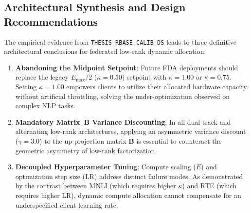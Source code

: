 \documentclass[10pt,a4paper]{article}
\begin{document}
\subsection{Architectural Synthesis and Design Recommendations}
The empirical evidence from \texttt{THESIS-RBASE-CALIB-DS} leads to three definitive architectural conclusions for federated low-rank dynamic allocation:
\begin{enumerate}
    \item \textbf{Abandoning the Midpoint Setpoint}: Future FDA deployments should replace the legacy $E_{\max}/2$ ($\kappa=0.50$) setpoint with $\kappa = 1.00$ or $\kappa = 0.75$. Setting $\kappa = 1.00$ empowers clients to utilize their allocated hardware capacity without artificial throttling, solving the under-optimization observed on complex NLP tasks.
    \item \textbf{Mandatory Matrix~B Variance Discounting}: In all dual-track and alternating low-rank architectures, applying an asymmetric variance discount ($\gamma = 3.0$) to the up-projection matrix $\mathbf{B}$ is essential to counteract the geometric asymmetry of low-rank factorization.
    \item \textbf{Decoupled Hyperparameter Tuning}: Compute scaling ($E$) and optimization step size ($\mathrm{LR}$) address distinct failure modes. As demonstrated by the contrast between MNLI (which requires higher $\kappa$) and RTE (which requires higher $\mathrm{LR}$), dynamic compute allocation cannot compensate for an underspecified client learning rate.
\end{enumerate}
\end{document}
